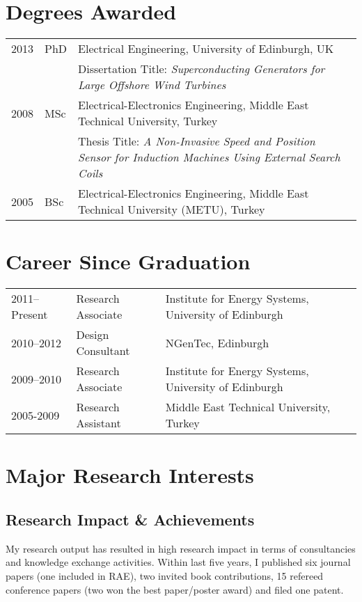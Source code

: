 \documentclass[a4paper,12pt]{article}
\begin{document}
\maketitle
 
\section{Degrees Awarded}
\begin{tabular}{llp{14cm}}
 2013 & PhD & Electrical Engineering, University of Edinburgh, UK\\  
& & Dissertation Title: \textit{Superconducting Generators for Large Offshore Wind Turbines} \\ 
 2008 & MSc & Electrical-Electronics Engineering, Middle East Technical University, Turkey \\
& & Thesis Title: \textit{A Non-Invasive Speed and Position Sensor for Induction Machines Using External Search Coils}\\
 2005 & BSc & Electrical-Electronics Engineering, Middle East Technical University (METU), Turkey \\

\end{tabular}

\section{Career Since Graduation}

\begin{tabular}{lp{3.6cm}l}
2011--Present & Research Associate & Institute for Energy Systems, University of Edinburgh \\ 
2010--2012 & Design Consultant & NGenTec, Edinburgh\\
2009--2010 & Research Associate & Institute for Energy Systems, University of Edinburgh\\
2005-2009 & Research Assistant & Middle East Technical University, Turkey\\ 
\end{tabular}


\section{Major Research Interests}

\subsection{Research Impact \& Achievements}
My research output has resulted in high research impact in terms of consultancies and knowledge exchange activities. Within last five years, I published six journal papers (one included in RAE), two invited book contributions, 15 refereed conference papers (two won the best paper/poster award) and filed one patent. 
\end{document}

